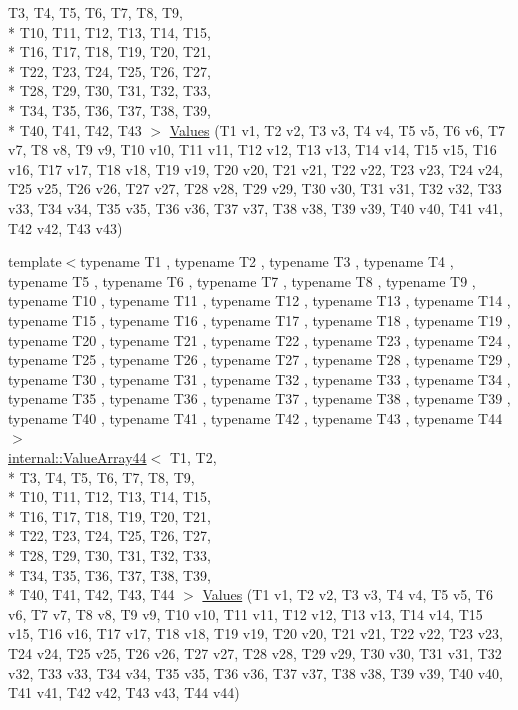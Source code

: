 \begin{DoxyCompactItemize}
T3, T4, T5, T6, T7, T8, T9, \\*
T10, T11, T12, T13, T14, T15, \\*
T16, T17, T18, T19, T20, T21, \\*
T22, T23, T24, T25, T26, T27, \\*
T28, T29, T30, T31, T32, T33, \\*
T34, T35, T36, T37, T38, T39, \\*
T40, T41, T42, T43 $>$ \hyperlink{namespacetesting_a316b2e13e635215ac89a50315bb66d81}{Values} (T1 v1, T2 v2, T3 v3, T4 v4, T5 v5, T6 v6, T7 v7, T8 v8, T9 v9, T10 v10, T11 v11, T12 v12, T13 v13, T14 v14, T15 v15, T16 v16, T17 v17, T18 v18, T19 v19, T20 v20, T21 v21, T22 v22, T23 v23, T24 v24, T25 v25, T26 v26, T27 v27, T28 v28, T29 v29, T30 v30, T31 v31, T32 v32, T33 v33, T34 v34, T35 v35, T36 v36, T37 v37, T38 v38, T39 v39, T40 v40, T41 v41, T42 v42, T43 v43)
\item 
{\footnotesize template$<$typename T1 , typename T2 , typename T3 , typename T4 , typename T5 , typename T6 , typename T7 , typename T8 , typename T9 , typename T10 , typename T11 , typename T12 , typename T13 , typename T14 , typename T15 , typename T16 , typename T17 , typename T18 , typename T19 , typename T20 , typename T21 , typename T22 , typename T23 , typename T24 , typename T25 , typename T26 , typename T27 , typename T28 , typename T29 , typename T30 , typename T31 , typename T32 , typename T33 , typename T34 , typename T35 , typename T36 , typename T37 , typename T38 , typename T39 , typename T40 , typename T41 , typename T42 , typename T43 , typename T44 $>$ }\\\hyperlink{classtesting_1_1internal_1_1ValueArray44}{internal\-::\-Value\-Array44}$<$ T1, T2, \\*
T3, T4, T5, T6, T7, T8, T9, \\*
T10, T11, T12, T13, T14, T15, \\*
T16, T17, T18, T19, T20, T21, \\*
T22, T23, T24, T25, T26, T27, \\*
T28, T29, T30, T31, T32, T33, \\*
T34, T35, T36, T37, T38, T39, \\*
T40, T41, T42, T43, T44 $>$ \hyperlink{namespacetesting_a42848f3794e196c5a74f4b21db0752dd}{Values} (T1 v1, T2 v2, T3 v3, T4 v4, T5 v5, T6 v6, T7 v7, T8 v8, T9 v9, T10 v10, T11 v11, T12 v12, T13 v13, T14 v14, T15 v15, T16 v16, T17 v17, T18 v18, T19 v19, T20 v20, T21 v21, T22 v22, T23 v23, T24 v24, T25 v25, T26 v26, T27 v27, T28 v28, T29 v29, T30 v30, T31 v31, T32 v32, T33 v33, T34 v34, T35 v35, T36 v36, T37 v37, T38 v38, T39 v39, T40 v40, T41 v41, T42 v42, T43 v43, T44 v44)

\end{DoxyCompactItemize}
